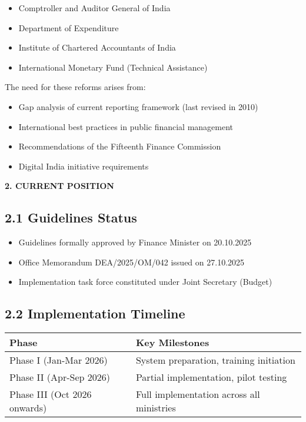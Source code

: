 \documentclass[12pt,a4paper]{article}
\newcommand{\sectionheader}[1]{\textbf{#1}}
\begin{document}
\begin{itemize}[leftmargin=*, itemsep=2pt]
    \item Comptroller and Auditor General of India
    \item Department of Expenditure
    \item Institute of Chartered Accountants of India
    \item International Monetary Fund (Technical Assistance)
\end{itemize}

The need for these reforms arises from:
\begin{itemize}[leftmargin=*, itemsep=2pt]
    \item Gap analysis of current reporting framework (last revised in 2010)
    \item International best practices in public financial management
    \item Recommendations of the Fifteenth Finance Commission
    \item Digital India initiative requirements
\end{itemize}

\vspace{0.5cm}

\sectionheader{2. CURRENT POSITION}

\subsection*{2.1 Guidelines Status}
\begin{itemize}[leftmargin=*, itemsep=2pt]
    \item Guidelines formally approved by Finance Minister on 20.10.2025
    \item Office Memorandum DEA/2025/OM/042 issued on 27.10.2025
    \item Implementation task force constituted under Joint Secretary (Budget)
\end{itemize}

\subsection*{2.2 Implementation Timeline}
\begin{table}[h]
\centering
\begin{tabular}{@{}ll@{}}
\toprule
\textbf{Phase} & \textbf{Key Milestones} \\
\midrule
Phase I (Jan-Mar 2026) & System preparation, training initiation \\
Phase II (Apr-Sep 2026) & Partial implementation, pilot testing \\
Phase III (Oct 2026 onwards) & Full implementation across all ministries \\
\bottomrule
\end{tabular}
\end{table}
\end{document}
